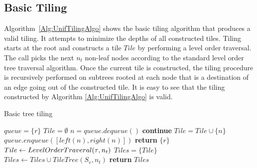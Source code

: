 \subsection{Basic Tiling}
\label{sec:UnifTiling}
Algorithm~\ref{Alg:UnifTilingAlgo} shows the basic tiling algorithm that produces a valid tiling. It 
attempts to minimize the depths of all constructed tiles. 
Tiling starts at the root and constructs a tile $Tile$ by performing
a level order traversal. The call  picks the next $n_t$ non-leaf nodes according to the standard 
level order tree traversal algorithm. Once the current tile is constructed, 
the tiling procedure is recursively performed on subtrees rooted at each node that is a destination of an edge going out of the constructed 
tile. It is easy to see that the tiling constructed by Algorithm \ref{Alg:UnifTilingAlgo} is valid.
\begin{algorithm}
  \caption{Basic tree tiling}
  \label{Alg:UnifTilingAlgo}
  \small{
  \begin{algorithmic}[1]
        \State $queue = \{ r \}$
        \State $Tile = \emptyset$
          \State $n = queue.dequeue()$
              \State \textbf{continue}
          \EndIf
          \State $Tile = Tile \cup \{ n \}$
          \State $queue.enqueue([left(n), right(n)])$
        \EndWhile
      \EndProcedure
      \State {}
              \State \textbf{return} $\{ r \}$
          \EndIf
          \State $Tile \leftarrow LevelOrderTraveral(\operatorname{\tau}, n_t)$
          \State $Tiles =  \{ Tile \}$
              \State $Tiles \leftarrow Tiles \cup TileTree(S_v, n_t)$
          \EndFor
          \State \textbf{return} $Tiles$
      \EndProcedure
  \end{algorithmic}
  }
\end{algorithm}

